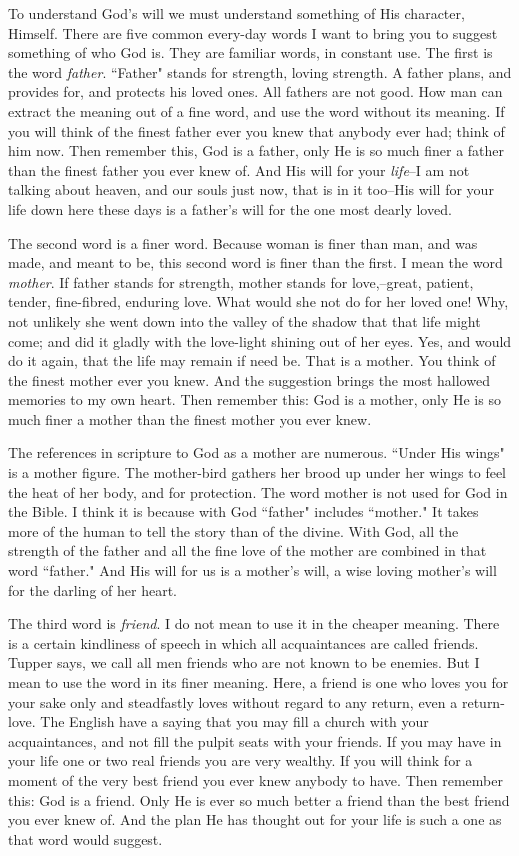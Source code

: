 To understand God's will we must understand something of His character,
Himself. There are five common every-day words I want to bring you to
suggest something of who God is. They are familiar words, in constant use.
The first is the word \textit{father}. ``Father" stands for strength, loving
strength. A father plans, and provides for, and protects his loved ones.
All fathers are not good. How man can extract the meaning out of a fine
word, and use the word without its meaning. If you will think of the
finest father ever you knew that anybody ever had; think of him now. Then
remember this, God is a father, only He is so much finer a father than the
finest father you ever knew of. And His will for your \textit{life}--I am not
talking about heaven, and our souls just now, that is in it too--His will
for your life down here these days is a father's will for the one most
dearly loved.

The second word is a finer word. Because woman is finer than man, and was
made, and meant to be, this second word is finer than the first. I mean
the word \textit{mother}. If father stands for strength, mother stands for
love,--great, patient, tender, fine-fibred, enduring love. What would she
not do for her loved one! Why, not unlikely she went down into the valley
of the shadow that that life might come; and did it gladly with the
love-light shining out of her eyes. Yes, and would do it again, that the
life may remain if need be. That is a mother. You think of the finest
mother ever you knew. And the suggestion brings the most hallowed memories
to my own heart. Then remember this: God is a mother, only He is so much
finer a mother than the finest mother you ever knew.

The references in scripture to God as a mother are numerous. ``Under His
wings" is a mother figure. The mother-bird gathers her brood up under her
wings to feel the heat of her body, and for protection. The word mother is
not used for God in the Bible. I think it is because with God ``father"
includes ``mother." It takes more of the human to tell the story than of
the divine. With God, all the strength of the father and all the fine love
of the mother are combined in that word ``father." And His will for us is a
mother's will, a wise loving mother's will for the darling of her heart.

The third word is \textit{friend}. I do not mean to use it in the cheaper
meaning. There is a certain kindliness of speech in which all
acquaintances are called friends. Tupper says, we call all men friends who
are not known to be enemies. But I mean to use the word in its finer
meaning. Here, a friend is one who loves you for your sake only and
steadfastly loves without regard to any return, even a return-love. The
English have a saying that you may fill a church with your acquaintances,
and not fill the pulpit seats with your friends. If you may have in your
life one or two real friends you are very wealthy. If you will think for a
moment of the very best friend you ever knew anybody to have. Then
remember this: God is a friend. Only He is ever so much better a friend
than the best friend you ever knew of. And the plan He has thought out for
your life is such a one as that word would suggest.

